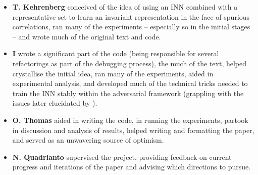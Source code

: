 %
{\renewcommand\labelitemi{}
%
\begin{itemize}
    \item 
        \textbf{T. Kehrenberg} conceived of the idea of using an INN combined with a
        representative set to learn an invariant representation in the face of spurious
        correlations, ran many of the experiments -- especially so in the initial stages -- and
        wrote much of the original text and code.
    \item 
        \textbf{I} wrote a significant part of the code (being responsible for several refactorings
        as part of the debugging process), the much of the text, helped crystallise the initial
        idea, ran many of the experiments, aided in experimental analysis, and developed much of
        the technical tricks needed to train the INN stably within the adversarial framework
        (grappling with the issues later elucidated by \cite{behrmann2021understanding}).
    \item 
        \textbf{O. Thomas} aided in writing the code, in running the experiments, partook in
        discussion and analysis of results, helped writing and formatting the paper, and served as
        an unwavering source of optimism.
    \item
        \textbf{N. Quadrianto} supervised the project, providing feedback on current progress and
        iterations of the paper and advising which directions to pursue.
\end{itemize}
%
}
